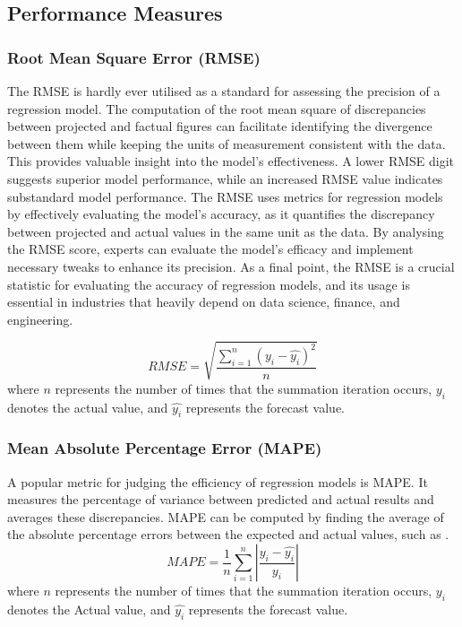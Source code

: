 \documentclass[a4paper, fleqn]{cas-sc}
\theoremstyle{definition}
\theoremstyle{remark}
\begin{document}
\subsection{ Performance Measures}
\subsubsection{Root Mean Square Error (RMSE) }
The RMSE is hardly ever utilised as a standard for assessing the precision of a regression model. The computation of the root mean square of discrepancies between projected and factual figures can facilitate identifying the divergence between them while keeping the units of measurement consistent with the data. This provides valuable insight into the model's effectiveness. A lower RMSE digit suggests superior model performance,  while an increased RMSE value indicates substandard model performance. The RMSE  uses metrics for regression models by effectively evaluating the model's accuracy,  as it quantifies the discrepancy between projected and actual values in the same unit as the data. By analysing the RMSE score,  experts can evaluate the model's efficacy and implement necessary tweaks to enhance its precision. As a final point,  the RMSE is a crucial statistic for evaluating the accuracy of regression models,  and its usage is essential in industries that heavily depend on data science,  finance,  and engineering.

\begin{equation} \label{rmsee}
  RMSE=\sqrt{\frac{\sum_{i=1}^{n}(y_{i}-\hat{y_{i}})^2}{n}}
\end{equation}
where $n$ represents the number of times that the summation iteration occurs,  \begin{math} y_{i} \end{math} denotes the actual value,  and \begin{math}\hat{y_{i}}\end{math} represents the forecast value.

\subsubsection{ Mean Absolute Percentage Error (MAPE)}
  A popular metric for judging the efficiency of regression models is MAPE. It measures the percentage of variance between predicted and actual results and averages these discrepancies. MAPE can be computed by finding the average of the absolute percentage errors between the expected and actual values,  such as .
\begin{equation} \label{mapee}
  MAPE=\frac{1}{n}\sum_{i=1}^{n} \left | \frac{y_{i}-\hat{y_{i}}}{y_{i}} \right |
\end{equation}
where $n$ represents the number of times that the summation iteration occurs,  \begin{math} y_{i} \end{math} denotes the Actual value,  and \begin{math}\hat{y_{i}}\end{math} represents the forecast value.
\end{document}
